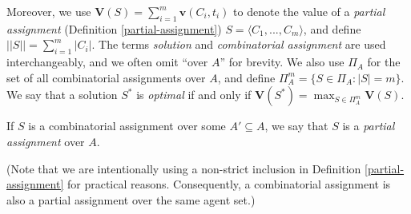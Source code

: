 \documentclass[runningheads]{llncs}
\newcommand{\pset}{\bm{\mathcal{P}}}
\newcounter{ctTODO}
\newcommand{\TODO}[1]{%
	\textcolor{red}{\textbf{TODO(\arabic{ctTODO}): } #1}%
	\addtocounter{ctTODO}{1}%
}
\begin{document}
	
	Moreover, we use $\bm{V}(S) = \sum_{i=1}^{m} \bm{v}(C_i, t_i)$ to denote the value of a \textit{partial assignment} (Definition \ref{partial-assignment}) \mbox{$S = \langle C_1,...,C_m \rangle$}, and define $||S|| = \sum_{i=1}^m|C_i|$. The terms \emph{solution} and \emph{combinatorial assignment} are used interchangeably, and we often omit ``over $A$'' for brevity. We also use $\Pi_A$ for the set of all combinatorial assignments over $A$, and define $\Pi_{A}^m = \{ S \in \Pi_A : |S| = m \}$. We say that a solution $S^*$ is \textit{optimal} if and only if $\bm{V}(S^*) = \max_{S \in \Pi^m_A}\bm{V}(S)$.
	
	\begin{definition}\label{partial-assignment}
		If $S$ is a combinatorial assignment over some $A' \subseteq A$, we say that $S$ is a \emph{partial assignment} over $A$. 
	\end{definition}
	
	(Note that we are intentionally using a non-strict inclusion in Definition \ref{partial-assignment} for practical reasons. Consequently, a combinatorial assignment is also a partial assignment over the same agent set.)
	
	
\end{document}

